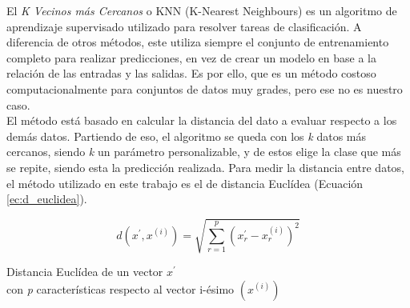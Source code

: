 El \textit{K Vecinos más Cercanos} o KNN (K-Nearest Neighbours) es un algoritmo de aprendizaje supervisado utilizado para resolver tareas de clasificación. A diferencia de otros métodos, este utiliza siempre el conjunto de entrenamiento completo para realizar predicciones, en vez de crear un modelo en base a la relación de las entradas y las salidas. Es por ello, que es un método costoso computacionalmente para conjuntos de datos muy grades, pero ese no es nuestro caso.\\

El método está basado en calcular la distancia del dato a evaluar respecto a los demás datos. Partiendo de eso, el algoritmo se queda con los \textit{k} datos más cercanos, siendo \textit{k} un parámetro personalizable, y de estos elige la clase que más se repite, siendo esta la predicción realizada. Para medir la distancia entre datos, el método utilizado en este trabajo es el de distancia Euclídea (Ecuación \ref{ec:d_euclidea}).\\

\begin{myequation}[h]
\begin{equation}
d(x^{\prime}, x^{(i)}) = \sqrt{\sum_{r=1}^{p}(x_{r}^{\prime}-x_{r}^{(i)})^{2}}
\nonumber
\label{ec:d_euclidea}
\end{equation}
\captionsetup{justification=centering}
\caption[Distancia Euclídea de un vector $x^{\prime}$ con \textit{p} características respecto al vector i-ésimo $(x^{(i)})$]{Distancia Euclídea de un vector $x^{\prime}$ \\
con \textit{p} características respecto al vector i-ésimo $(x^{(i)})$}
\end{myequation} 

